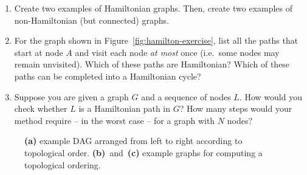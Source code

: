 \documentclass[a4paper]{article}
\begin{document}
\begin{enumerate}
  
\item
  Create two examples of Hamiltonian graphs.
  Then, create two examples of non-Hamiltonian (but connected) graphs.

\item
  For the graph shown in Figure~\ref{fig:hamilton-exercise}, list all the paths that start at node $A$ and visit each node \emph{at most} once (i.e.\ some nodes may remain unvisited).
  Which of these paths are Hamiltonian?
  Which of these paths can be completed into a Hamiltonian cycle?
  
\item
  Suppose you are given a graph $G$ and a sequence of nodes $L$.
  How would you check whether $L$ is a Hamiltonian path in $G$?
  How many steps would your method require -- in the worst case -- for a graph with $N$ nodes?
  
\end{enumerate}





\begin{figure}[H]
  \centering
  \caption{
    \textbf{(a)} example DAG arranged from left to right according to topological order.
    \textbf{(b)}~and~\textbf{(c)} example graphs for computing a topological ordering.
  }\label{fig:topo-order}
\end{figure}
\end{document}
